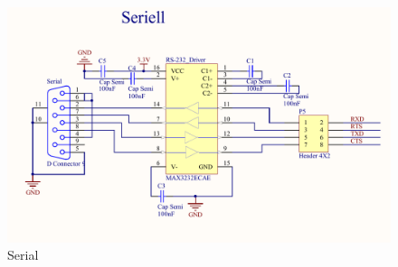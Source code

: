 \begin{figure}[h]
  \centering
  \includegraphics[width=\textwidth]{fig/pcb/schematics/pcbschematic_serial.pdf}
  \caption{Serial}
  \label{fig:schematic-pcb-serial}
\end{figure}
